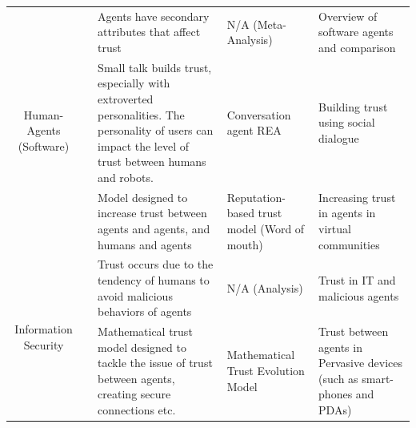 \documentclass[runningheads,a4paper]{llncs}
\begin{document}
\begin{center}
\begin{longtable}{|c|c|p{4cm}|p{2cm}|p{2cm}|}
	\multirow{3}{*}{Human-Agents (Software) } 
	& \cite{nwana1996software}
	& Agents have secondary attributes that affect trust                    
	& N/A (Meta-Analysis)                
	& Overview of software agents and comparison            
	\\ \cline{2-5}
	& \cite{bickmore2001relational}
	& Small talk builds trust, especially with extroverted personalities. The personality of users can impact the level of trust between humans and robots.
	& Conversation agent REA
	& Building trust using social dialogue
	\\ \cline{2-5} 
	& \cite{abdul2000supporting}
	& Model designed to increase trust between agents and agents, and humans and agents                     
	& Reputation-based trust model (Word of mouth)            
	& Increasing trust in agents in virtual communities
	\\ \hline
	
	\multirow{2}{*}{Information Security } 
	& \cite{josang1998modelling}
	& Trust occurs due to the tendency of humans to avoid malicious behaviors of agents                   
	& N/A (Analysis)
	& Trust in IT and malicious agents
	\\ \cline{2-5} 
	& \cite{almenarez2006developing}
	& Mathematical trust model designed to tackle the issue of trust between agents, creating secure connections etc.    
	& Mathematical Trust Evolution Model                       
	& Trust between agents in Pervasive devices (such as smart-phones and PDAs)
	\\ \hline
	

\end{longtable}
\end{center}
\end{document}
